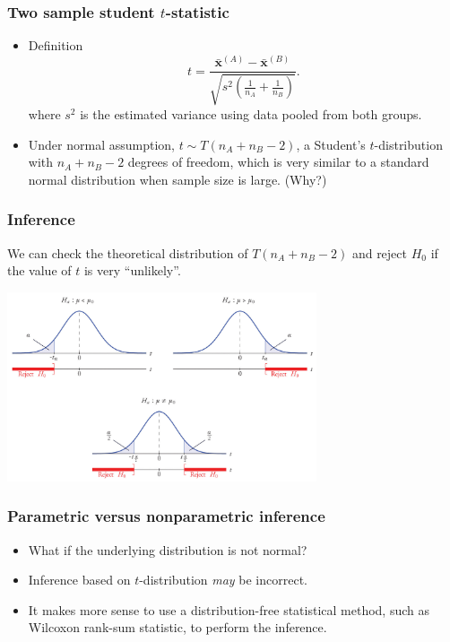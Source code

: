 \begin{frame}
  \frametitle{Two sample student $t$-statistic}
  \begin{itemize}
  \item Definition
    \begin{equation}
      \label{eq:t}
      t = \frac{\bar{\mathbf{x}}^{(A)}-\bar{\mathbf{x}}^{(B)}} {\sqrt{s^2(\frac{1}{n_{A}}+\frac{1}{n_{B}})}}.
    \end{equation}
    where $s^{2}$ is the estimated variance using data pooled from both
    groups.
  \item Under normal assumption, $t \sim T(n_{A}+n_{B}-2)$, a Student's
    $t$-distribution with $n_{A}+n_{B}-2$ degrees of freedom, which is
    very similar to a standard normal distribution when sample size is
    large. (Why?)
  \end{itemize}
\end{frame}

\begin{frame}
  \frametitle{Inference}
  We can check the theoretical distribution of $T(n_{A}+n_{B}-2)$ and
  reject $H_{0}$ if the value of $t$ is very ``unlikely''.
  \begin{center}
    \includegraphics[height=2.2in]{HT1}
  \end{center}
\end{frame}

\begin{frame}
  \frametitle{Parametric versus nonparametric inference}
  \begin{itemize}
  \item What if the underlying distribution is not normal?
  \item Inference based on $t$-distribution \emph{may} be incorrect.
  \item It makes more sense to use a distribution-free statistical
    method, such as Wilcoxon rank-sum statistic, to perform the
    inference.
  \end{itemize}
\end{frame}

